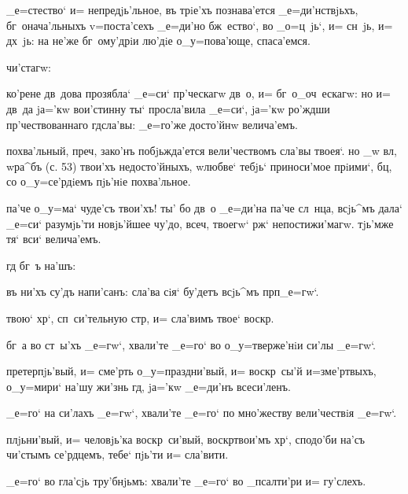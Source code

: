   _е=стество` и= 
непредjь'льное, въ трiе'хъ познава'ется _е=ди'нствjьхъ, 
бг~онача'льныхъ v=поста'сехъ _е=ди'но бж~ество`, во 
_о=ц~jь`, и= сн~jь, и= дх~jь: на не'же бг~ому'дрiи лю'дiе 
о_у=пова'юще, спаса'емся.

   чи'стагw:

 ко'рене дв~дова прозябла` _е=си` пр'ческагw 
дв~о, и= бг~о_оч~ескагw: но и= дв~да jа='кw вои'стинну 
ты` просла'вила _е=си`, jа='кw ро'ждши 
пр'чествованнаго гд сла'вы: _е=го'же досто'йнw 
велича'емъ.

 похва'льный, преч, зако'нъ побjьжда'ется 
вели'чествомъ сла'вы твоея`. но _w вл, w\т ра^бъ (с. 
53) твои'хъ недосто'йныхъ, w\т любве` тебjь` приноси'мое 
прiими`, бц, со о_у=се'рдiемъ пjь'нiе похва'льное.

 па'че о_у=ма` чуде'съ твои'хъ! ты' бо дв~о 
_е=ди'на па'че сл~нца, всjь^мъ дала` _е=си` разумjь'ти 
новjь'йшее чу'до, всеч, твоегw` рж` 
непостижи'магw. тjь'мже тя` вси` велича'емъ.

      гд 
бг~ъ на'шъ: 


  въ ни'хъ су'дъ напи'санъ: сла'ва 
сiя` бу'детъ всjь^мъ прп _е=гw`.

 твою` хр`, сп~си'тельную стр, и= 
сла'вимъ твое` воскр.

  бг~а во ст~ы'хъ _е=гw`, хвали'те 
_е=го` во о_у=тверже'нiи си'лы _е=гw`.

 претерпjь'вый, и= сме'рть о_у=праздни'вый, и= 
воскр~сы'й и=з\ъ ме'ртвыхъ, о_у=мири` на'шу жи'знь гд, 
jа='кw _е=ди'нъ всеси'ленъ.

  _е=го` на си'лахъ _е=гw`, хвали'те 
_е=го` по мно'жеству вели'чествiя _е=гw`.

 плjьни'вый, и= человjь'ка воскр~си'вый, 
воскр твои'мъ хр`, сподо'би на'съ чи'стымъ 
се'рдцемъ, тебе` пjь'ти и= сла'вити.

  _е=го` во гла'сjь тру'бнjьмъ: 
хвали'те _е=го` во _псалти'ри и= гу'слехъ.

